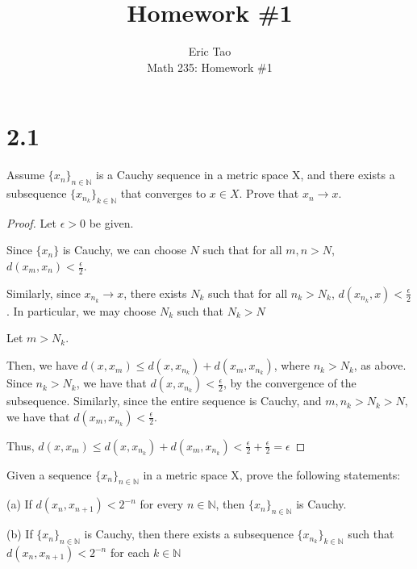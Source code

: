 \documentclass[10pt]{article}
\newenvironment{problem}[2][Problem]{\begin{trivlist}
\item[\hskip \labelsep {\bfseries #1}\hskip \labelsep {\bfseries #2.}]}{\end{trivlist}}
\begin{document}
 
\title{Homework \#1}
\author{Eric Tao\\
Math 235: Homework \#1}
\maketitle
 
\section*{2.1}

\begin{problem}{1.1.20}
Assume ${\{x_n\}_{n\in\mathbb{N}}}$ is a Cauchy sequence in a metric space X, and there exists a subsequence ${\{x_{n_k}\}_{k\in\mathbb{N}}}$  that converges to $x \in X$. Prove that $x_n \rightarrow x$.
\end{problem}

\begin{proof}[Proof]
Let $ \epsilon > 0$ be given.

Since ${\{x_n\}}$ is Cauchy, we can choose $N$ such that for all $ m,n > N$, $d(x_m,x_n) < \frac{\epsilon}{2}$.

Similarly, since $x_{n_k} \rightarrow x$, there exists $N_k$ such that for all $n_k > N_k$, $d(x_{n_k},x) < \frac{\epsilon}{2}$. In particular, we may choose $N_k$ such that $N_k > N$

Let $m > N_k$. 

Then, we have $d(x, x_m) \leq d(x,x_{n_k}) + d(x_m,x_{n_k})$, where $n_k > N_k$, as above. Since $n_k > N_k$, we have that $d(x,x_{n_k}) < \frac{\epsilon}{2}$, by the convergence of the subsequence.
Similarly, since the entire sequence is Cauchy, and $m,n_k > N_k > N$, we have that $d(x_m,x_{n_k}) < \frac{\epsilon}{2}$.

Thus, $d(x, x_m) \leq d(x,x_{n_k}) + d(x_m,x_{n_k}) <  \frac{\epsilon}{2} +  \frac{\epsilon}{2} = \epsilon $ 

\end{proof}

\begin{problem}{1.1.21}
Given a sequence ${\{x_n\}_{n\in\mathbb{N}}}$ in a metric space X, prove the following statements:

(a) If $d(x_n,x_{n+1}) < 2^{-n}$ for every $n \in \mathbb{N}$, then ${\{x_n\}_{n\in\mathbb{N}}}$ is Cauchy.

(b) If  ${\{x_n\}_{n\in\mathbb{N}}}$ is Cauchy, then there exists a subsequence ${\{x_{n_k}\}_{k \in \mathbb{N}}}$ such that $d(x_n,x_{n+1}) < 2^{-n}$ for each $k \in \mathbb{N}$
\end{problem}
\end{document}
